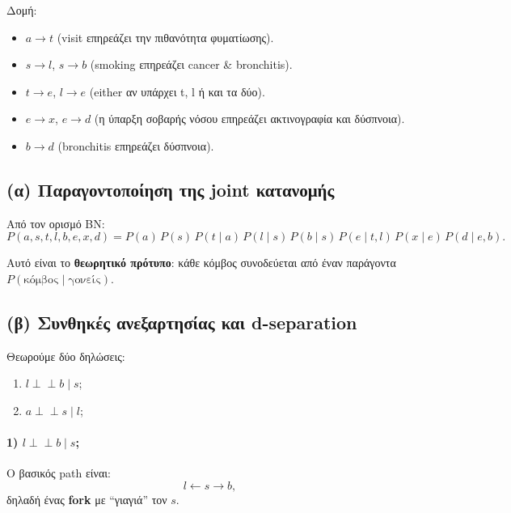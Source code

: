 \documentclass[a4paper,11pt]{article}
\begin{document}
Δομή:

\begin{itemize}
  \item $a \to t$ (visit επηρεάζει την πιθανότητα φυματίωσης).
  \item $s \to l$, $s \to b$ (smoking επηρεάζει cancer \& bronchitis).
  \item $t \to e$, $l \to e$ (either αν υπάρχει t, l ή και τα δύο).
  \item $e \to x$, $e \to d$ (η ύπαρξη σοβαρής νόσου επηρεάζει ακτινογραφία και δύσπνοια).
  \item $b \to d$ (bronchitis επηρεάζει δύσπνοια).
\end{itemize}

\subsection{(α) Παραγοντοποίηση της joint κατανομής}

Από τον ορισμό BN:
\[
P(a,s,t,l,b,e,x,d)
= P(a)\,P(s)\,P(t \mid a)\,P(l \mid s)\,P(b \mid s)\,
  P(e \mid t,l)\,P(x \mid e)\,P(d \mid e,b).
\]

Αυτό είναι το \textbf{θεωρητικό πρότυπο}:
κάθε κόμβος συνοδεύεται από έναν παράγοντα $P(\text{κόμβος}\mid\text{γονείς})$.

\subsection{(β) Συνθηκές ανεξαρτησίας και d-separation}

Θεωρούμε δύο δηλώσεις:

\begin{enumerate}
  \item $l \perp\!\!\!\perp b \mid s$;
  \item $a \perp\!\!\!\perp s \mid l$;
\end{enumerate}

\paragraph{1) $l \perp\!\!\!\perp b \mid s$;}

Ο βασικός path είναι:
\[
l \leftarrow s \rightarrow b,
\]
δηλαδή ένας \textbf{fork} με ``γιαγιά'' τον $s$.
\end{document}
